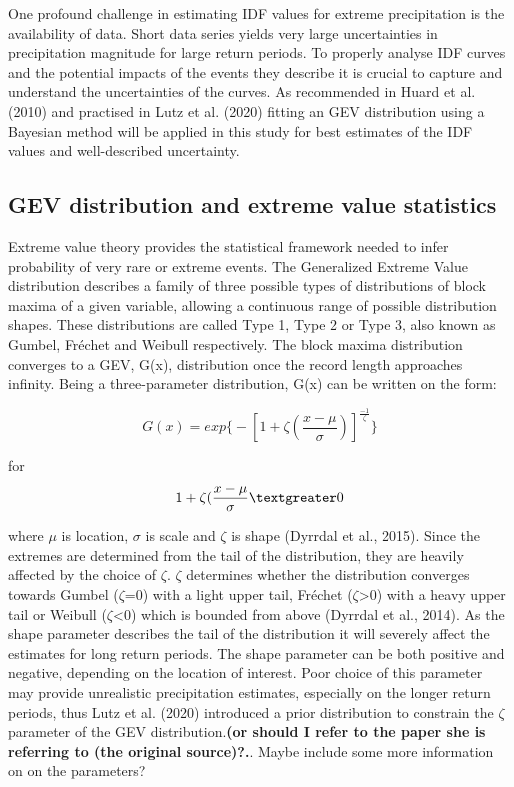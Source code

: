 One profound challenge in estimating IDF values for extreme precipitation is the availability of data. Short data series yields very large uncertainties in precipitation magnitude for large return periods. To properly analyse IDF curves and the potential impacts of the events they describe it is crucial to capture and understand the uncertainties of the curves. As recommended in Huard et al. (2010) and practised in Lutz et al. (2020) fitting an GEV distribution using a Bayesian method will be applied in this study for best estimates of the IDF values and well-described uncertainty.  
 

\subsection{GEV distribution and extreme value statistics}

Extreme value theory provides the statistical framework needed to infer probability of very rare or extreme events. The Generalized Extreme Value distribution describes a family of three possible types of distributions of block maxima of a given variable, allowing a continuous range of possible distribution shapes. These distributions are called Type 1, Type 2 or Type 3, also known as Gumbel, Fréchet and Weibull respectively. The block maxima distribution converges to a GEV, G(x), distribution once the record length approaches infinity. Being a three-parameter distribution, G(x) can be written on the form:

\begin{equation}
	G(x) = exp\bigg\{-\left[1+\zeta(\frac{x-\mu}{\sigma})\right]^\frac{-1}{\zeta}\bigg\}
	\label{eq:gev}
\end{equation}

for 
\begin{equation}
	1+\zeta(\frac{x-\mu}{\sigma} \textgreater 0
\end{equation}

where $\mu$ is location, $\sigma$ is scale and $\zeta$ is shape (Dyrrdal et al., 2015). Since the extremes are determined from the tail of the distribution, they are heavily affected by the choice of $\zeta$. $\zeta$ determines whether the distribution converges towards Gumbel ($\zeta$=0) with a light upper tail, Fréchet ($\zeta$\textgreater0) with a heavy upper tail or Weibull ($\zeta$\textless0) which is bounded from above (Dyrrdal et al., 2014). As the shape parameter describes the tail of the distribution it will severely affect the estimates for long return periods. The shape parameter can be both positive and negative, depending on the location of interest. Poor choice of this parameter may provide unrealistic precipitation estimates, especially on the longer return periods, thus Lutz et al. (2020) introduced a prior distribution to constrain the $\zeta$ parameter of the GEV distribution.\textbf{(or should I refer to the paper she is referring to (the original source)?.}. Maybe include some more information on on the parameters? 

